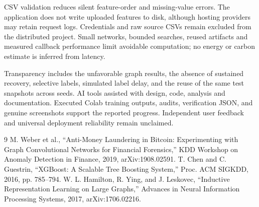 \documentclass[10pt,twocolumn,letterpaper]{article}
\begin{document}
CSV validation reduces silent feature-order and missing-value errors. The application does not write uploaded features to disk, although hosting providers may retain request logs. Credentials and raw source CSVs remain excluded from the distributed project. Small networks, bounded searches, reused artifacts and measured callback performance limit avoidable computation; no energy or carbon estimate is inferred from latency.

Transparency includes the unfavorable graph results, the absence of sustained recovery, selective labels, simulated label delay, and the reuse of the same test snapshots across seeds. AI tools assisted with design, code, analysis and documentation. Executed Colab training outputs, audits, verification JSON, and genuine screenshots support the reported progress. Independent user feedback and universal deployment reliability remain unclaimed.

\begin{thebibliography}{9}
 M. Weber et al., ``Anti-Money Laundering in Bitcoin: Experimenting with Graph Convolutional Networks for Financial Forensics,'' KDD Workshop on Anomaly Detection in Finance, 2019, arXiv:1908.02591.
 T. Chen and C. Guestrin, ``XGBoost: A Scalable Tree Boosting System,'' Proc. ACM SIGKDD, 2016, pp. 785--794.
 W. L. Hamilton, R. Ying, and J. Leskovec, ``Inductive Representation Learning on Large Graphs,'' Advances in Neural Information Processing Systems, 2017, arXiv:1706.02216.
\end{thebibliography}
\end{document}
